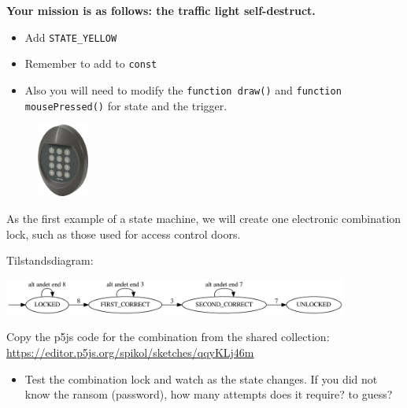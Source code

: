 \begin{exercisebox}[adjusted title= Finite state machines - Task]
\textbf{Your mission is as follows: the traffic light self-destruct.}
\begin{itemize}
\item Add \texttt{STATE\_YELLOW}
\item Remember to add to \texttt{const}
\item Also you will need to modify the \texttt{function draw()} and \texttt{function mousePressed()} for state and the trigger.
\end{itemize}
\end{exercisebox}

\begin{exercisebox}[adjusted title= Finite state machines - Padlock]

\begin{minipage}{1.0\linewidth}
\begin{figure}
   \vspace{-1em}
   \includegraphics[width=0.15\textwidth]{illustrationer/unitek_kombinationslaas.jpg}
\end{figure}
 
As the first example of a state machine, we will create one
electronic combination lock, such as those used for access control
doors.

\noindent
Tilstandsdiagram:

\noindent
\includegraphics[width=0.85\textwidth]{graphviz/combinationLock_dumb}

Copy the p5js code for the combination from the shared collection: 
\mbox{\url{https://editor.p5js.org/spikol/sketches/qqyKLj46m}}

\end{minipage}

\begin{itemize}
\item Test the combination lock and watch as the state changes. If you
did not know the ransom (password), how many attempts does it require?
to guess?


\end{itemize}
\end{exercisebox}
